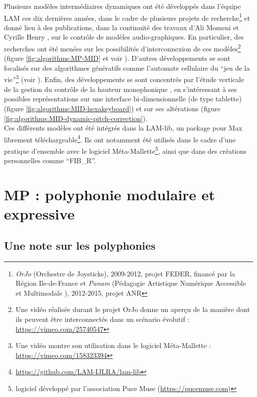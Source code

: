 \noindent Plusieurs modèles intermédiaires dynamiques ont été développés dans l'équipe \gls{LAM} ces dix dernières années, dans le cadre de plusieurs projets de recherche\footnote{\textit{OrJo} (Orchestre de Joysticks), 2009-2012, projet FEDER, financé par la Région Ile-de-France et \textit{Panam} (Pédagogie Artistique Numérique Accessible et Multimodale ), 2012-2015, projet \gls{ANR}} et donné lieu à des publications, dans la continuité des travaux d'Ali Momeni et Cyrille Henry \cite{momeni_dynamic_2006}, sur le contrôle de modèles audio-graphiques. En particulier, des recherches ont été menées sur les possibilités d'interconnexion de ces modèles\footnote{Une vidéo réalisée durant le projet OrJo donne un aperçu de la manière dont ils peuvent être interconnectés dans un scénario évolutif : \url{https://vimeo.com/25740547}} (figure \ref{fig:algorithms:MP-MID} et voir \cite{goudard_dynamic_2011}). D'autres développements se sont focalisés sur des algorithmes génératifs comme l'automate cellulaire du ``jeu de la vie''\footnote{Une vidéo montre son utilisation dans le logiciel Méta-Mallette : \url{https://vimeo.com/158323394}} (voir \cite{goudard_modeintermediaire_2012}). Enfin, des développements se sont concentrés par l'étude verticale de la gestion du contrôle de la hauteur monophonique \cite{goudard_playing_2014}, en s'intéressant à ses possibles représentations sur une interface bi-dimensionnelle (de type tablette)(figure \ref{fig:algorithms:MID-hexakeyboard}) et sur ses altérations (figure \ref{fig:algorithms:MID-dynamic-pitch-correction}).\\
\indent Ces différents modèles ont été intégrés dans la LAM-lib, un package pour Max librement téléchargeable\footnote{\url{https://github.com/LAM-IJLRA/lam-lib}}. Ils ont notamment été utilisés dans le cadre d'une pratique d'ensemble avec le logiciel Méta-Mallette\footnote{logiciel développé par l'association Puce Muse (\url{https://pucemuse.com})}, ainsi que dans des créations personnelles comme ``FIB\_R''.


\section{MP : polyphonie modulaire et expressive}
\label{sec:algorithms:MP}
\subsection{Une note sur les polyphonies}

